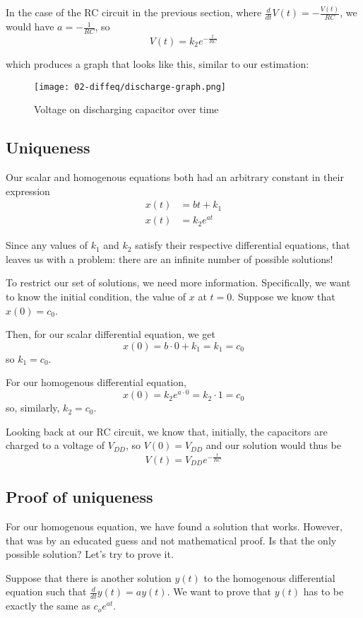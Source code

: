 \documentclass[11pt]{article}
\begin{document}
In the case of the RC circuit in the previous section, where $\frac d{dt}V(t)=-\frac{V(t)}{RC}$, we would have $a=-\frac 1{RC}$, so \[V(t)=k_2e^{-\frac t{RC}}\]

which produces a graph that looks like this, similar to our estimation:

\begin{figure}[H]
    \centering
        \texttt{[image: 02-diffeq/discharge-graph.png]}
    \caption{Voltage on discharging capacitor over time}
\end{figure}

\subsection{Uniqueness}

Our scalar and homogenous equations both had an arbitrary constant in their expression 
\begin{align*}
    x(t)&=bt+k_1\\
    x(t)&=k_2e^{at}
\end{align*}

Since any values of $k_1$ and $k_2$ satisfy their respective differential equations, that leaves us with a problem: there are an infinite number of possible solutions!

To restrict our set of solutions, we need more information. Specifically, we want to  know the initial condition, the value of $x$ at $t=0$. Suppose we know that $x(0)=c_0$. 

Then, for our scalar differential equation, we get \[x(0)=b\cdot 0+k_1=k_1=c_0\] so $k_1=c_0$.

For our homogenous differential equation, \[x(0)=k_2e^{a\cdot 0}=k_2\cdot 1=c_0\] so, similarly, $k_2=c_0$.

Looking back at our RC circuit, we know that, initially, the capacitors are charged to a voltage of $V_{DD}$, so $V(0)=V_{DD}$ and our solution would thus be \[V(t)=V_{DD}e^{-\frac t{RC}}\]

\subsection{Proof of uniqueness}

For our homogenous equation, we have found a solution that works. However, that was by an educated guess and not mathematical proof. Is that the only possible solution? Let's try to prove it.

Suppose that there is another solution $y(t)$ to the homogenous differential equation such that $\frac d{dt}y(t)=ay(t)$. We want to prove that $y(t)$ has to be exactly the same as $c_oe^{at}$. 
\end{document}
